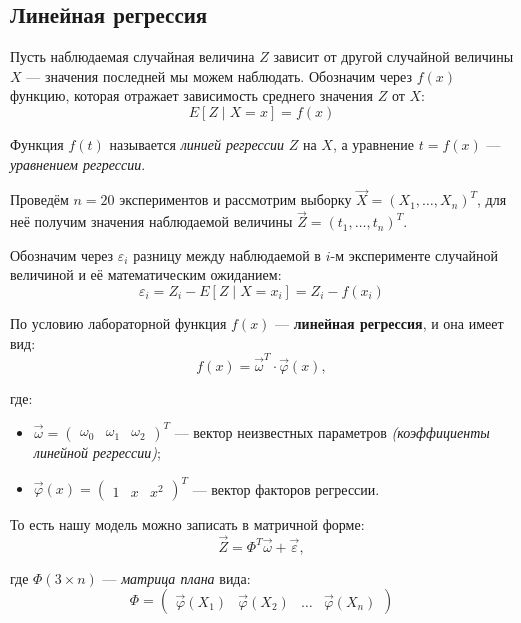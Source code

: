 \subsection{Линейная регрессия}

Пусть наблюдаемая случайная величина \( Z \) зависит от другой случайной величины \( X \) --- значения последней мы можем наблюдать. Обозначим через \( f(x) \) функцию, которая отражает зависимость среднего значения \( Z \) от \( X \):
\[
    E[Z\mid X=x]=f(x)
\]

Функция \( f(t) \) называется \textit{линией регрессии} \( Z \) на \( X \), а уравнение \( t=f(x) \) --- \textit{уравнением регрессии}.

Проведём \( n=20 \) экспериментов и рассмотрим выборку \( \vec{X}=(X_1,\ldots,X_n)^T \), для неё получим значения наблюдаемой величины \( \vec{Z}=(t_1,\ldots,t_n)^T \).

Обозначим через \( \varepsilon_i \) разницу между наблюдаемой в \( i \)-м эксперименте случайной величиной и её математическим ожиданием:
\[
    \varepsilon_i=Z_i-E[Z\mid X=x_i]=Z_i-f(x_i)
\]

По условию лабораторной функция \( f(x) \) --- \textbf{линейная регрессия}, и она имеет вид:
\[
    f(x)=\vec{\omega}^T\cdot\vec{\varphi}(x),
\]

где:
\begin{itemize}
    \item \( \vec{\omega}=\begin{pmatrix}
        \omega_0 & \omega_1 & \omega_2
    \end{pmatrix}^T \) --- вектор неизвестных параметров \textit{(коэффициенты линейной регрессии)};
    \item \( \vec{\varphi}(x)=\begin{pmatrix}
        1 & x & x^2
    \end{pmatrix}^T \) --- вектор факторов регрессии.
\end{itemize}

То есть нашу модель можно записать в матричной форме:
\begin{equation}
    \vec{Z}=\Phi^T\vec{\omega}+\vec{\varepsilon},\label{eq:model}
\end{equation}

где \( \Phi(3\times n) \) --- \textit{матрица плана} вида:
\[
    \Phi=\begin{pmatrix}
        \vec{\varphi}(X_1) & \vec{\varphi}(X_2) & \dots & \vec{\varphi}(X_n)
    \end{pmatrix}
\]